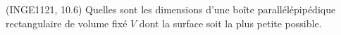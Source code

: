 
\begin{exercice}\label{exoDerrivePartielle-0009}

	(INGE1121, 10.6) Quelles sont les dimensions d'une boîte parallélépipédique rectangulaire de volume fixé $V$ dont la surface soit la plus petite possible.

\end{exercice}
